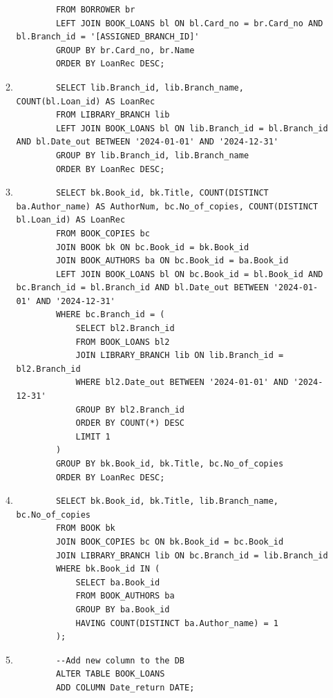 \documentclass[12pt,a4paper]{article}
\begin{document}
\begin{enumerate}
\begin{enumerate}
\begin{verbatim}
        FROM BORROWER br
        LEFT JOIN BOOK_LOANS bl ON bl.Card_no = br.Card_no AND bl.Branch_id = '[ASSIGNED_BRANCH_ID]'
        GROUP BY br.Card_no, br.Name
        ORDER BY LoanRec DESC;
        \end{verbatim}
        \item
        \begin{verbatim}
        SELECT lib.Branch_id, lib.Branch_name, COUNT(bl.Loan_id) AS LoanRec
        FROM LIBRARY_BRANCH lib
        LEFT JOIN BOOK_LOANS bl ON lib.Branch_id = bl.Branch_id AND bl.Date_out BETWEEN '2024-01-01' AND '2024-12-31'
        GROUP BY lib.Branch_id, lib.Branch_name
        ORDER BY LoanRec DESC;
        \end{verbatim}
        \item
        \begin{verbatim}
        SELECT bk.Book_id, bk.Title, COUNT(DISTINCT ba.Author_name) AS AuthorNum, bc.No_of_copies, COUNT(DISTINCT bl.Loan_id) AS LoanRec
        FROM BOOK_COPIES bc
        JOIN BOOK bk ON bc.Book_id = bk.Book_id
        JOIN BOOK_AUTHORS ba ON bc.Book_id = ba.Book_id
        LEFT JOIN BOOK_LOANS bl ON bc.Book_id = bl.Book_id AND bc.Branch_id = bl.Branch_id AND bl.Date_out BETWEEN '2024-01-01' AND '2024-12-31'
        WHERE bc.Branch_id = (
            SELECT bl2.Branch_id
            FROM BOOK_LOANS bl2
            JOIN LIBRARY_BRANCH lib ON lib.Branch_id = bl2.Branch_id
            WHERE bl2.Date_out BETWEEN '2024-01-01' AND '2024-12-31'
            GROUP BY bl2.Branch_id
            ORDER BY COUNT(*) DESC
            LIMIT 1
        )
        GROUP BY bk.Book_id, bk.Title, bc.No_of_copies
        ORDER BY LoanRec DESC;
        \end{verbatim}

        \item
        \begin{verbatim}
        SELECT bk.Book_id, bk.Title, lib.Branch_name, bc.No_of_copies
        FROM BOOK bk
        JOIN BOOK_COPIES bc ON bk.Book_id = bc.Book_id
        JOIN LIBRARY_BRANCH lib ON bc.Branch_id = lib.Branch_id
        WHERE bk.Book_id IN (
            SELECT ba.Book_id
            FROM BOOK_AUTHORS ba
            GROUP BY ba.Book_id
            HAVING COUNT(DISTINCT ba.Author_name) = 1
        );
        \end{verbatim}
        \item
        \begin{verbatim}
        --Add new column to the DB
        ALTER TABLE BOOK_LOANS
        ADD COLUMN Date_return DATE;


\end{verbatim}
\end{enumerate}
\end{enumerate}
\end{document}
